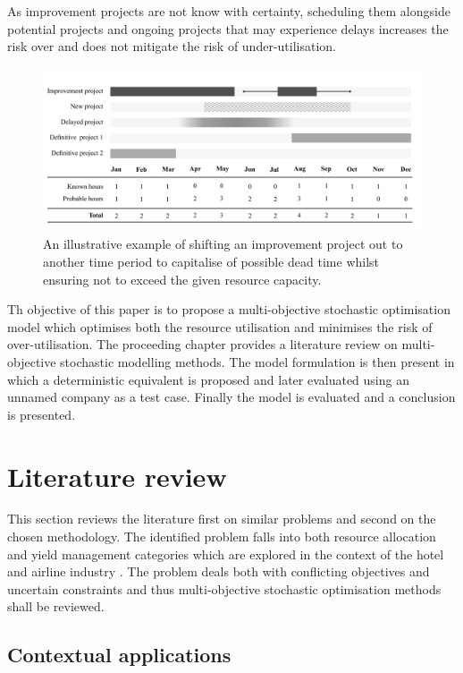 \documentclass[a4paper,11pt]{article}
\begin{document}
As improvement projects are not know with certainty, scheduling them alongside potential projects and ongoing projects that may experience delays increases the risk over and does not mitigate the risk of under-utilisation. 


\begin{figure}[]
\label{fig:1}
\includegraphics[width=15cm]{../img/Resource-allocation.pdf}
\caption{An illustrative example of shifting an improvement project out to another time period to capitalise of possible dead time whilst ensuring not to exceed the given resource capacity.}
\end{figure}

Th objective of this paper is to propose a multi-objective stochastic optimisation model which optimises both the resource utilisation and minimises the risk of over-utilisation. The proceeding chapter provides a literature review on multi-objective stochastic modelling methods. The model formulation is then present in which a deterministic equivalent is proposed and later evaluated using an unnamed company as a test case. Finally the model is evaluated and a conclusion is presented.


\section{Literature review}
This section reviews the literature first on similar problems and second on the chosen methodology. The identified problem falls into both resource allocation and yield management categories which are explored in the context of the hotel and airline industry \citep{cleophas2017resilient}. The problem deals both with conflicting objectives and uncertain constraints and thus multi-objective stochastic optimisation methods shall be reviewed.

\subsection{Contextual applications}
\end{document}
